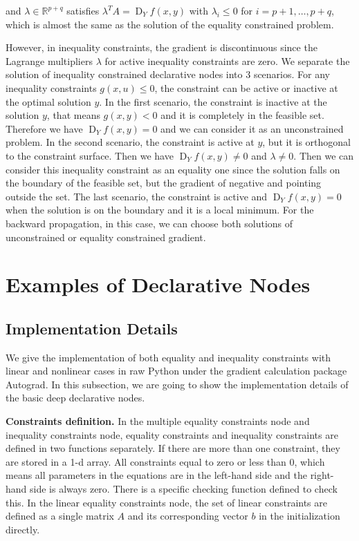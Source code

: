 and $\lambda \in \mathbb{R}^{p+q}$ satisfies $\lambda ^T A = \operatorname{D}_Yf(x,y)$ with $\lambda_i \leq 0$ for $i = p+1, \dots, p+q$, which is almost the same as the solution of the equality constrained problem. 
\par However, in inequality constraints, the gradient is discontinuous since the Lagrange multipliers $\lambda$ for active inequality constraints are zero. We separate the solution of inequality constrained declarative nodes into 3 scenarios. For any inequality constraints $g(x, u) \leq 0$, the constraint can be active or inactive at the optimal solution $y$. In the first scenario, the constraint is inactive at the solution $y$, that means $g(x,y) < 0$ and it is completely in the feasible set. Therefore we have $\operatorname{D}_Yf(x,y) = 0$ and we can consider it as an unconstrained problem. In the second scenario, the constraint is active at $y$, but it is orthogonal to the constraint surface. Then we have $\operatorname{D}_Yf(x,y) \neq 0$ and $\lambda \neq 0$. Then we can consider this inequality constraint as an equality one since the solution falls on the boundary of the feasible set, but the gradient of negative and pointing outside the set. The last scenario, the constraint is active and $\operatorname{D}_Yf(x,y) = 0$ when the solution is on the boundary and it is a local minimum. For the backward propagation, in this case, we can choose both solutions of unconstrained or equality constrained gradient. 

\section{Examples of Declarative Nodes}
\label{sec:example}
\subsection{Implementation Details}
We give the implementation of both equality and inequality constraints with linear and nonlinear cases in raw Python under the gradient calculation package Autograd\citep{MD:15}. In this subsection, we are going to show the implementation details of the basic deep declarative nodes.
\par \textbf{Constraints definition.}  
In the multiple equality constraints node and inequality constraints node, equality constraints and inequality constraints are defined in two functions separately. If there are more than one constraint, they are stored in a 1-d array. All constraints equal to zero or less than 0, which means all parameters in the equations are in the left-hand side and the right-hand side is always zero. There is a specific checking function defined to check this. In the linear equality constraints node, the set of linear constraints are defined as a single matrix $A$ and its corresponding vector $b$ in the initialization directly. 

